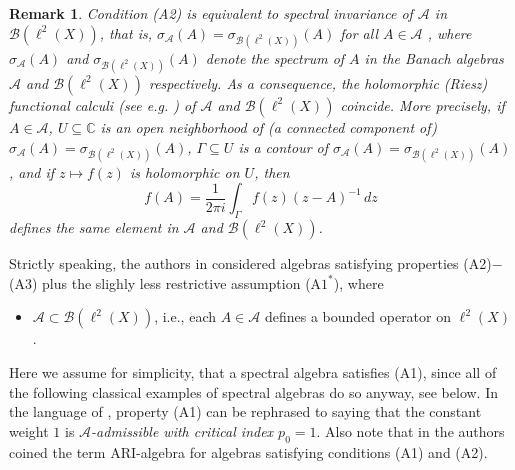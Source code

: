 \documentclass{amsart}
\newtheorem{rem.}[theorem]{Remark}
\newcommand{\B}[0]{{\mathcal{B}}}
\newcommand{\A}[0]{{\mathcal{A}}}
\begin{document}
\begin{rem.}\label{holfunccalc}
Condition (A2) is equivalent to \emph{spectral invariance} of $\A$ in $\B(\ell^2(X))$, that is, $\sigma_{\A}(A) = \sigma_{\B(\ell^2(X))}(A)$ for all $A\in \A$ \cite[Lemma 2.4]{gr10-2}, where $\sigma_{\A}(A)$ and $\sigma_{\B(\ell^2(X))}(A)$ denote the spectrum of $A$ in the Banach algebras $\A$ and $\B(\ell^2(X))$ respectively. As a consequence, the holomorphic (Riesz) functional calculi (see e.g. \cite[Chapter~VII]{conw1}) of $\A$ and $\B(\ell^2(X))$ coincide. More precisely, if %
$A\in \A$, $U\subseteq \mathbb{C}$ is an open neighborhood of (a connected component of) $\sigma_{\A}(A) = \sigma_{\B(\ell^2(X))}(A)$, $\Gamma \subseteq U$ is a contour of $\sigma_{\A}(A) = \sigma_{\B(\ell^2(X))}(A) $, and if $z\mapsto f(z)$ is holomorphic on $U$, then 
$$f(A) = \frac{1}{2\pi i}\int_{\Gamma} f(z)(z - A)^{-1} \, dz$$
defines the same element in $\A$ and $\B(\ell^2(X))$. 
\end{rem.}

Strictly speaking, the authors in \cite{forngroech1} considered algebras satisfying properties (A2)$-$(A3) plus the slighly less restrictive assumption (A$1^\ast$), where
\begin{itemize}
 \item [(A$1^\ast$)] $\A \subset \B(\ell^2(X))$, i.e., each $A \in \mathcal{A}$ defines a bounded operator on $\ell^2 (X)$. 
\end{itemize} Here we assume for simplicity, that a spectral algebra  satisfies (A1), since all of the following classical examples of spectral algebras do so anyway, see below. In the language of \cite[Definition~2]{forngroech1}, property (A1) can be rephrased to saying that the constant weight $1$ is \emph{$\A$-admissible with critical index $p_0=1$}. Also note that in \cite{lifting} the authors coined the term ARI-algebra for algebras satisfying conditions (A1) and (A2).  
\end{document}
